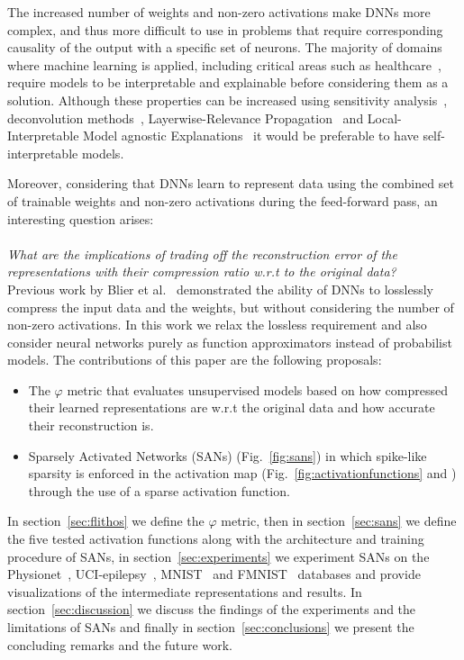 \documentclass[journal]{IEEEtran}
\begin{document}
The increased number of weights and non-zero activations make DNNs more complex, and thus more difficult to use in problems that require corresponding causality of the output with a specific set of neurons.
The majority of domains where machine learning is applied, including critical areas such as healthcare~\cite{bizopoulos2019deep}, require models to be interpretable and explainable before considering them as a solution.
Although these properties can be increased using sensitivity analysis~\cite{simonyan2013deep}, deconvolution methods~\cite{zeiler2014visualizing}, Layerwise-Relevance Propagation~\cite{bach2015pixel} and Local-Interpretable Model agnostic Explanations~\cite{ribeiro2016should} it would be preferable to have self-interpretable models.

Moreover, considering that DNNs learn to represent data using the combined set of trainable weights and non-zero activations during the feed-forward pass, an interesting question arises:
\\\\
\indent\textit{What are the implications of trading off the reconstruction error of the representations with their compression ratio w.r.t to the original data?}
\\

Previous work by Blier et al.~\cite{blier2018description} demonstrated the ability of DNNs to losslessly compress the input data and the weights, but without considering the number of non-zero activations.
In this work we relax the lossless requirement and also consider neural networks purely as function approximators instead of probabilist models.
The contributions of this paper are the following proposals:
\begin{itemize}
	\item The $\varphi$ metric that evaluates unsupervised models based on how compressed their learned representations are w.r.t the original data and how accurate their reconstruction is.
	\item Sparsely Activated Networks (SANs) (Fig.~\ref{fig:sans}) in which spike-like sparsity is enforced in the activation map (Fig.~\ref{fig:activationfunctions} and ) through the use of a sparse activation function.
\end{itemize}

In section~\ref{sec:flithos} we define the $\varphi$ metric, then in section~\ref{sec:sans} we define the five tested activation functions along with the architecture and training procedure of SANs, in section~\ref{sec:experiments} we experiment SANs on the Physionet~\cite{goldberger2000physiobank}, UCI-epilepsy~\cite{andrzejak2001indications}, MNIST~\cite{lecun1998gradient} and FMNIST~\cite{xiao2017fashion} databases and provide visualizations of the intermediate representations and results.
In section~\ref{sec:discussion} we discuss the findings of the experiments and the limitations of SANs and finally in section~\ref{sec:conclusions} we present the concluding remarks and the future work.
\end{document}
